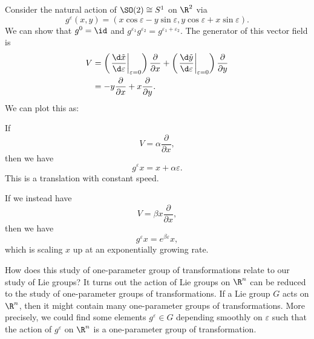 \documentclass[a4paper]{article}
\begin{document}
\begin{eg}
  Consider the natural action of $\SO(2) \cong S^1$ on $\R^2$ via
  \[
    g^\varepsilon(x, y) = (x \cos \varepsilon - y \sin \varepsilon, y \cos \varepsilon + x \sin \varepsilon).
  \]
  We can show that $g^0 = \id$ and $g^{\varepsilon_1} g^{\varepsilon_2} = g^{\varepsilon_1 + \varepsilon_2}$. The generator of this vector field is
  \begin{align*}
    V &= \left(\left.\frac{\d \tilde{x}}{\d \varepsilon}\right|_{\varepsilon = 0}\right)\frac{\partial}{\partial x} + \left(\left.\frac{\d \tilde{y}}{\d \varepsilon}\right|_{\varepsilon = 0}\right) \frac{\partial}{\partial y}\\
    &= -y \frac{\partial}{\partial x} + x \frac{\partial}{\partial y}.
  \end{align*}
  We can plot this as:
  \begin{center}
  \end{center}
\end{eg}

\begin{eg}
  If
  \[
    V = \alpha \frac{\partial}{\partial x},
  \]
  then we have
  \[
    g^\varepsilon x = x + \alpha \varepsilon.
  \]
  This is a translation with constant speed.

  If we instead have
  \[
    V = \beta x \frac{\partial}{\partial x},
  \]
  then we have
  \[
    g^\varepsilon x = e^{\beta\varepsilon} x,
  \]
  which is scaling $x$ up at an exponentially growing rate.
\end{eg}

How does this study of one-parameter group of transformations relate to our study of Lie groups? It turns out the action of Lie groups on $\R^n$ can be reduced to the study of one-parameter groups of transformations. If a Lie group $G$ acts on $\R^n$, then it might contain many one-parameter groups of transformations. More precisely, we could find some elements $g^{\varepsilon} \in G$ depending smoothly on $\varepsilon$ such that the action of $g^\varepsilon$ on $\R^n$ is a one-parameter group of transformation.
\end{document}
